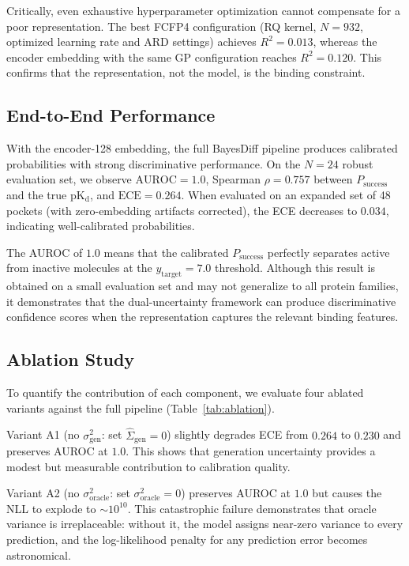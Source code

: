 \documentclass{article}
\newcommand{\Psuccess}{P_{\mathrm{success}}}
\newcommand{\Ugen}{\sigma^{2}_{\mathrm{gen}}}
\newcommand{\Uoracle}{\sigma^{2}_{\mathrm{oracle}}}
\newcommand{\Siggen}{\hat{\Sigma}_{\mathrm{gen}}}
\newcommand{\ytarget}{y_{\mathrm{target}}}
\newcommand{\pKd}{\mathrm{pK_d}}
\begin{document}
Critically, even exhaustive hyperparameter optimization cannot compensate
for a poor representation.  The best FCFP4 configuration (RQ kernel,
$N = 932$, optimized learning rate and ARD settings) achieves
$R^{2} = 0.013$, whereas the encoder embedding with the same GP
configuration reaches $R^{2} = 0.120$.  This confirms that the
representation, not the model, is the binding constraint.

\subsection{End-to-End Performance}

With the encoder-128 embedding, the full BayesDiff pipeline produces
calibrated probabilities with strong discriminative performance.  On the
$N = 24$ robust evaluation set, we observe $\mathrm{AUROC} = 1.0$,
Spearman $\rho = 0.757$ between $\Psuccess$ and the true $\pKd$, and
$\mathrm{ECE} = 0.264$.  When evaluated on an expanded set of 48
pockets (with zero-embedding artifacts corrected), the ECE decreases to
$0.034$, indicating well-calibrated probabilities.

The AUROC of $1.0$ means that the calibrated $\Psuccess$ perfectly
separates active from inactive molecules at the $\ytarget = 7.0$
threshold.  Although this result is obtained on a small evaluation set
and may not generalize to all protein families, it demonstrates that the
dual-uncertainty framework can produce discriminative confidence scores
when the representation captures the relevant binding features.

\subsection{Ablation Study}

To quantify the contribution of each component, we evaluate four ablated
variants against the full pipeline (Table~\ref{tab:ablation}).

Variant A1 (no $\Ugen$: set $\Siggen = 0$) slightly degrades ECE from
$0.264$ to $0.230$ and preserves AUROC at $1.0$.  This shows that
generation uncertainty provides a modest but measurable contribution to
calibration quality.

Variant A2 (no $\Uoracle$: set $\Uoracle = 0$) preserves AUROC at $1.0$
but causes the NLL to explode to ${\sim}10^{10}$.  This catastrophic
failure demonstrates that oracle variance is irreplaceable: without it,
the model assigns near-zero variance to every prediction, and the
log-likelihood penalty for any prediction error becomes astronomical.
\end{document}
